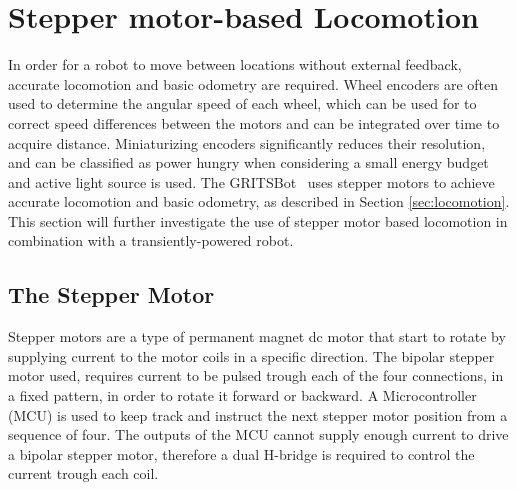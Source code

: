 

\section{Stepper motor-based Locomotion}

In order for a robot to move between locations without external feedback, accurate locomotion and basic odometry are required.
Wheel encoders are often used to determine the angular speed of each wheel, which can be used for to correct speed differences between the motors and can be integrated over time to acquire distance.
Miniaturizing encoders significantly reduces their resolution, and can be classified as power hungry when considering a small energy budget and active light source is used.
The GRITSBot~\cite{pickem_icra_2015} uses stepper motors to achieve accurate locomotion and basic odometry, as described in Section \ref{sec:locomotion}.
This section will further investigate the use of stepper motor based locomotion in combination with a transiently-powered robot.

\subsection{The Stepper Motor}
Stepper motors are a type of permanent magnet dc motor that start to rotate by supplying current to the motor coils in a specific direction.
The bipolar stepper motor used, requires current to be pulsed trough each of the four connections, in a fixed pattern, in order to rotate it forward or backward.
A Microcontroller (MCU) is used to keep track and instruct the next stepper motor position from a sequence of four.
The outputs of the MCU cannot supply enough current to drive a bipolar stepper motor, therefore a dual H-bridge is required to control the current trough each coil.

